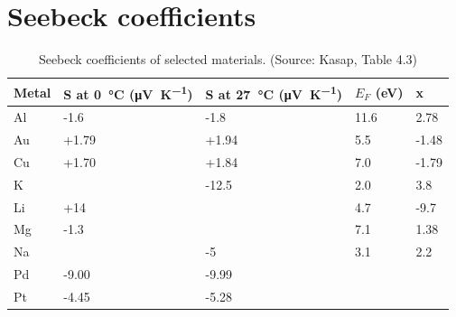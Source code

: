 \section{Seebeck coefficients}
\begin{table}[ht!]
    \centering
    \begin{tabular}{lllll}
    Metal & S at \SI{0}{\degreeCelsius} (\si{\micro\volt\per\kelvin}) & S at \SI{27}{\degreeCelsius} (\si{\micro\volt\per\kelvin}) & $E_F$ (\si{\eV}) & x \\ \toprule
    Al   & -1.6    & -1.8   & 11.6 & 2.78    \\
    Au  & +1.79 & +1.94 & 5.5   & -1.48  \\
    Cu  & +1.70 & +1.84 & 7.0   & -1.79  \\
    K    &            &  -12.5 & 2.0   & 3.8      \\
    Li   & +14     &           & 4.7    & -9.7    \\
    Mg & -1.3    &           & 7.1    & 1.38     \\
    Na  &            & -5      & 3.1   & 2.2        \\
    Pd  & -9.00   & -9.99 &         &             \\
    Pt  & -4.45    & -5.28 &         &             \\ \bottomrule
    \end{tabular}
    \caption{Seebeck coefficients of selected materials. (Source: Kasap, Table 4.3)}
    \label{app:Seebeck}
\end{table}